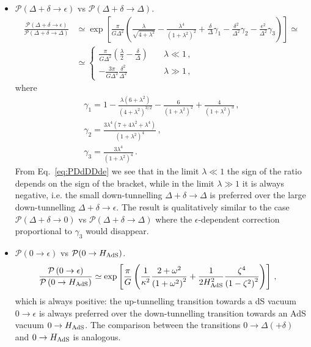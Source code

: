 \documentclass[11pt,a4paper]{article}
\begin{document}
\begin{itemize}
\item $\mathcal{P}(\Delta + \delta \rightarrow \epsilon)$ vs $\mathcal{P}(\Delta + \delta \rightarrow \Delta)$.
\begin{align}
\frac{\mathcal{P}\left(\Delta + \delta \rightarrow \epsilon\right)}{\mathcal{P}\left(\Delta + \delta \rightarrow\Delta\right)} &\simeq \exp\left[\frac{\pi}{G \Delta^2} \left(\frac{\lambda}{\sqrt{4 + \lambda^2}} - \frac{\lambda^4}{(1 + \lambda^2)^2} + \frac{\delta}{\Delta} \gamma_1 - \frac{\delta^2}{\Delta^2} \gamma_2 - \frac{\epsilon^2}{\Delta^2} \gamma_3\right)\right] \simeq \nonumber \\
&\simeq \begin{cases} \frac{\pi}{G \Delta^2} \left(\frac{\lambda}{2} - \frac{\delta}{\Delta}\right) \quad &\lambda \ll 1 \,, \\
- \frac{3 \pi}{G \Delta^2} \frac{\delta^2}{\Delta^2} \quad &\lambda \gg 1 \,,
\end{cases}
\label{eq:PDdDDde}
\end{align}
where
\begin{equation}
\begin{gathered}
\gamma_1 = 1 - \frac{\lambda (6 + \lambda^2)}{(4 + \lambda^2)^{3/2}} - \frac{6}{(1 + \lambda^2)^2} + \frac{4}{(1 + \lambda^2)^3} \,, \\
\gamma_2 = \frac{3 \lambda^4 (7 + 4 \lambda^2 + \lambda^4)}{(1 + \lambda^2)^4} \,, \\
\gamma_3 = \frac{3 \lambda^4}{(1 + \lambda^2)^4} \,.
\end{gathered}
\end{equation}
From Eq.~\eqref{eq:PDdDDde} we see that in the limit $\lambda \ll 1$ the sign of the ratio depends on the sign of the bracket, while in the limit $\lambda \gg 1$ it is always negative, i.e. the small down-tunnelling $\Delta + \delta \rightarrow \Delta$ is preferred over the large down-tunnelling $\Delta + \delta \rightarrow \epsilon$. The result is qualitatively similar to the case $\mathcal{P}(\Delta + \delta \rightarrow 0)$ vs $\mathcal{P}(\Delta + \delta \rightarrow \Delta)$ where the $\epsilon$-dependent correction proportional to $\gamma_3$ would disappear.

\item $\mathcal{P}(0 \rightarrow\epsilon)$ vs $\mathcal{P}(0 \rightarrow H_{\rm AdS})$.
\begin{align}
\frac{\mathcal{P}\left(0 \rightarrow \epsilon\right)}{\mathcal{P}\left(0 \rightarrow H_{\rm AdS}\right)} &\simeq \exp\left[\frac{\pi}{G} \left(\frac{1}{\kappa^2} \frac{2 + \omega^2}{\left(1 + \omega^2\right)^2} + \frac{1}{2 H_{\rm AdS}^2} \frac{\zeta^4}{\left(1 - \zeta^2\right)^2}\right)\right] \,,
\end{align}
which is always positive: the up-tunnelling transition towards a dS vacuum $0 \rightarrow \epsilon$ is always preferred over the down-tunnelling transition towards an AdS vacuum $0 \rightarrow H_{\rm AdS}$. The comparison between the transitions $0 \rightarrow \Delta (+ \delta)$ and $0 \rightarrow H_{\rm AdS}$ is analogous.


\end{itemize}
\end{document}
